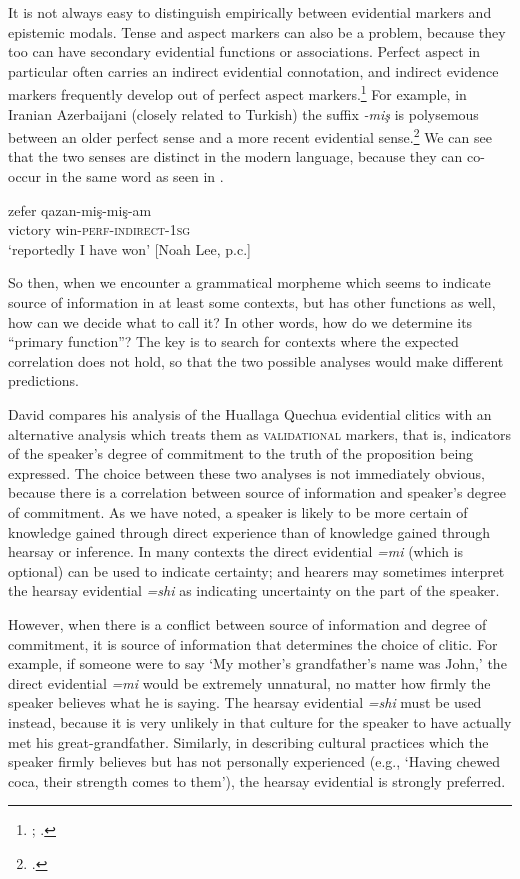 It is not always easy to distinguish empirically between evidential markers and epistemic modals. Tense and aspect markers can also be a problem, because they too can have secondary evidential functions or associations. Perfect aspect in particular often carries an indirect evidential connotation, and indirect evidence markers frequently develop out of perfect aspect markers.\footnote{\citet{Izvorski1997}; \citet{BybeeEtAl1994}.} For example, in Iranian Azerbaijani (closely related to Turkish) the suffix \textit{-miş} is polysemous between an older perfect sense and a more recent evidential sense.\footnote{\citet{Lee2008}.} We can see that the two senses are distinct in the modern language, because they can co-occur in the same word as seen in .


\ea \label{ex:17.5}
\gll zefer  qazan-miş-miş-am\\
victory  win-\textsc{perf}-\textsc{indirect-1sg}\\
\glt ‘reportedly I have won’  [Noah Lee, p.c.]
\z


So then, when we encounter a grammatical morpheme which seems to indicate source of information in at least some contexts, but has other functions as well, how can we decide what to call it? In other words, how do we determine its “primary function”? The key is to search for contexts where the expected correlation does not hold, so that the two possible analyses would make different predictions.



David \citet[421ff]{Weber1989} compares his analysis of the Huallaga Quechua evidential clitics with an alternative analysis which treats them as \textsc{validational} markers, that is, indicators of the speaker’s degree of commitment to the truth of the proposition being expressed. The choice between these two analyses is not immediately obvious, because there is a correlation between source of information and speaker’s degree of commitment. As we have noted, a speaker is likely to be more certain of knowledge gained through direct experience than of knowledge gained through hearsay or inference. In many contexts the direct evidential \textit{=mi} (which is optional) can be used to indicate certainty; and hearers may sometimes interpret the hearsay evidential \textit{=shi} as indicating uncertainty on the part of the speaker.



However, when there is a conflict between source of information and degree of commitment, it is source of information that determines the choice of clitic. For example, if someone were to say ‘My mother’s grandfather’s name was John,’ the direct evidential \textit{=mi} would be extremely unnatural, no matter how firmly the speaker believes what he is saying. The hearsay evidential \textit{=shi} must be used instead, because it is very unlikely in that culture for the speaker to have actually met his great-grandfather. Similarly, in describing cultural practices which the speaker firmly believes but has not personally experienced (e.g., ‘Having chewed coca, their strength comes to them’), the hearsay evidential is strongly preferred.



